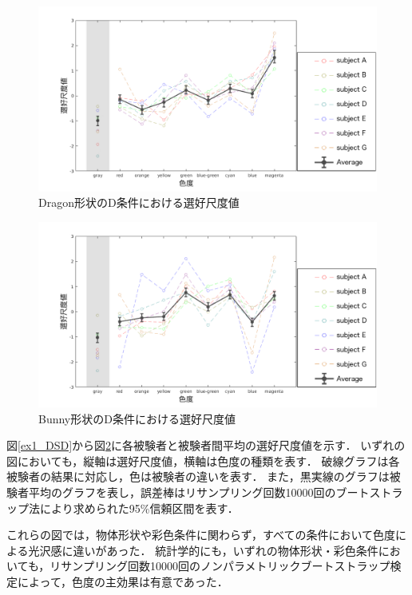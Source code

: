             \newpage
            \begin{figure}[h]
                \centering
                \includegraphics[width=15.0cm]{./img/ex1_res_DD_p.png}
                \caption{Dragon形状のD条件における選好尺度値}
                \label{ex1_DD}
            \end{figure}

            \begin{figure}[h]
                \centering
                \includegraphics[width=15.0cm]{./img/ex1_res_BD_p.png}
                \caption{Bunny形状のD条件における選好尺度値}
                \label{ex1_BD}
            \end{figure}

            図\ref{ex1_DSD}から図\ref{ex1_BD}に各被験者と被験者間平均の選好尺度値を示す．
            いずれの図においても，縦軸は選好尺度値，横軸は色度の種類を表す．
            破線グラフは各被験者の結果に対応し，色は被験者の違いを表す．
            また，黒実線のグラフは被験者平均のグラフを表し，誤差棒はリサンプリング回数10000回のブートストラップ法により求められた95\%信頼区間を表す．

            これらの図では，物体形状や彩色条件に関わらず，すべての条件において色度による光沢感に違いがあった．
            統計学的にも，いずれの物体形状・彩色条件においても，リサンプリング回数10000回のノンパラメトリックブートストラップ検定によって，色度の主効果は有意であった．

